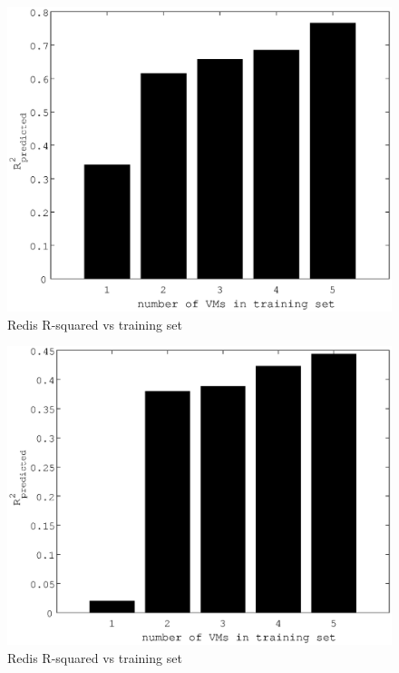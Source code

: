 \documentclass{acm_proc_article-sp}
\begin{document}
\begin{figure}
\centering
\includegraphics[scale = 0.5]{bar_read_avg_latency_r3__r3_x_m3__m3_2x_r3_2x_m3_x.eps}
\caption{Redis R-squared vs training set}
\label{figure:redisbarread}
\end{figure}


\begin{figure}
\centering
\includegraphics[scale = 0.5]{bar_read_avg_latency_r3__r3_2x_m3_2x_m3__m3_x_r3_x.eps}
\caption{Redis R-squared vs training set}
\label{figure:redisbarread}
\end{figure}
\end{document}
